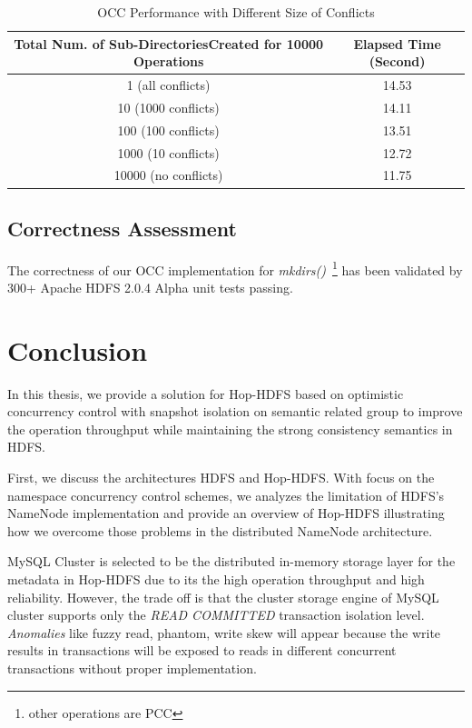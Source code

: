 \documentclass[runningheads,a4paper]{llncs}
\begin{document}
\begin{table}[ht]
	\centering
	\begin{tabular}{|c|c|}
		\hline
		\textbf{Total Num. of Sub-DirectoriesCreated for 10000 Operations} & \textbf{Elapsed Time (Second)} \\ \hline
		1 (all conflicts)                                                  & 14.53                          \\ \hline
		10 (1000 conflicts)                                                & 14.11                          \\ \hline
		100 (100 conflicts)                                                & 13.51                          \\ \hline
		1000 (10 conflicts)                                                & 12.72                          \\ \hline
		10000 (no conflicts)                                               & 11.75                          \\ \hline
	\end{tabular}
	\caption{OCC Performance with Different Size of Conflicts}
	\label{table:conflictsA}
\end{table}

\subsection{Correctness Assessment}
The correctness of our OCC implementation for \textit{mkdirs()}~\footnote{other operations are PCC} has been validated by 300+ Apache HDFS 2.0.4 Alpha unit tests passing.

\section{Conclusion}
In this thesis, we provide a solution for Hop-HDFS based on optimistic concurrency control with snapshot isolation on semantic related group to improve the operation throughput while maintaining the strong consistency semantics in HDFS.

First, we discuss the architectures HDFS and Hop-HDFS. With focus on the namespace concurrency control schemes, we analyzes the limitation of HDFS's NameNode implementation and provide an overview of Hop-HDFS illustrating how we overcome those problems in the distributed NameNode architecture.

MySQL Cluster is selected to be the distributed in-memory storage layer for the metadata in Hop-HDFS due to its the high operation throughput and high reliability. However, the trade off is that the cluster storage engine of MySQL cluster supports only the \textit{READ COMMITTED} transaction isolation level. \textit{Anomalies} like fuzzy read, phantom, write skew will appear because the write results in transactions will be exposed to reads in different concurrent transactions without proper implementation.
\end{document}

